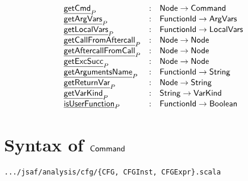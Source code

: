 \[
\begin{array}{lcl}
  \underline{\sf getCmd}_{P} & : & \mbox{\textsf{Node}} \rightarrow \mbox{\textsf{Command}} \\
  \underline{\sf getArgVars}_{P} & : & \mbox{\textsf{FunctionId}} \rightarrow \mbox{\textsf{ArgVars}} \\
  \underline{\sf getLocalVars}_{P} & : & \mbox{\textsf{FunctionId}} \rightarrow \mbox{\textsf{LocalVars}} \\
  \underline{\sf getCallFromAftercall}_{P} & : & \mbox{\textsf{Node}} \rightarrow \mbox{\textsf{Node}} \\
  \underline{\sf getAftercallFromCall}_{P} & : & \mbox{\textsf{Node}} \rightarrow \mbox{\textsf{Node}} \\
  \underline{\sf getExcSucc}_{P} & : & \mbox{\textsf{Node}} \rightarrow \mbox{\textsf{Node}} \\
  \underline{\sf getArgumentsName}_{P} & : & \mbox{\textsf{FunctionId}} \rightarrow \mbox{\textsf{String}} \\
  \underline{\sf getReturnVar}_{P} & : & \mbox{\textsf{Node}} \rightarrow \mbox{\textsf{String}} \\
  \underline{\sf getVarKind}_{P} & : & \mbox{\textsf{String}} \rightarrow \mbox{\textsf{VarKind}} \\
  \underline{\sf isUserFunction}_{P} & : & \mbox{\textsf{FunctionId}} \rightarrow \mbox{\textsf{Boolean}} \\
\end{array}
\]

\section{Syntax of $\mbox{\textsf{Command}}$}
{\inblue\tt .../jsaf/analysis/cfg/\{CFG, CFGInst, CFGExpr\}.scala}\\


